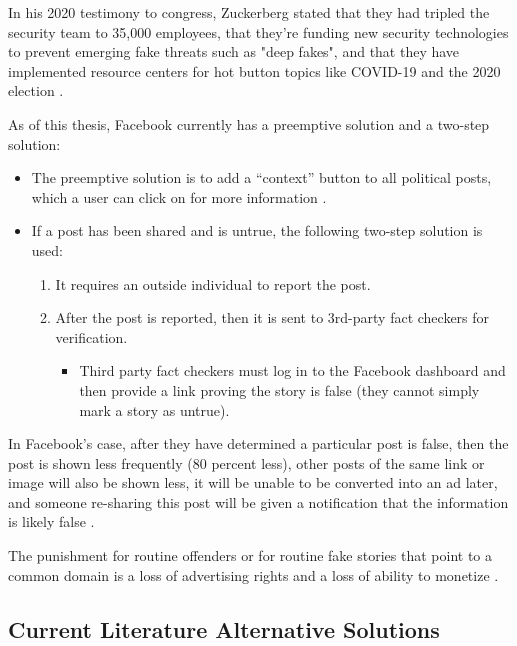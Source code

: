 \documentclass[12pt]{article}
\begin{document}
In his 2020 testimony to congress, Zuckerberg stated that they had tripled the security team to 35,000 employees, that they're funding new security technologies to prevent emerging fake threats such as "deep fakes", and that they have implemented resource centers for hot button topics like COVID-19 and the 2020 election \cite{zuckerberg2020}.


As of this thesis, Facebook currently has a preemptive solution and a two-step solution:
\renewcommand{\labelenumii}{\Roman{enumii}}
\begin{itemize}
\item The preemptive solution is to add a “context” button to all political posts, which a user can click on for more information \cite{smith2018designing}.
 \item If a post has been shared and is untrue, the following two-step solution is used:
 \begin{enumerate}
     \item It requires an outside individual to report the post. 
     \item After the post is reported, then it is  sent to 3rd-party fact checkers for verification. 
     \begin{itemize}
     \item Third party fact checkers must log in to the Facebook dashboard and then provide a link proving the story is false (they cannot simply mark a story as untrue).
     \end{itemize}
 \end{enumerate}
 \end{itemize}
 
 In Facebook’s case, after they have determined a particular post is false, then the post is shown less frequently (80 percent less), other posts of the same link or image will also be shown less, it will be unable to be converted into an ad later, and someone re-sharing this post will be given a notification that the information is likely false \cite{owen2016clamping,facebook2020fact}.
 
 The punishment for routine offenders or for routine fake stories that point to a common domain is a loss of advertising rights and a loss of ability to monetize \cite{facebook2020fact}.
 
 \subsection{Current Literature Alternative Solutions}
 
\end{document}
